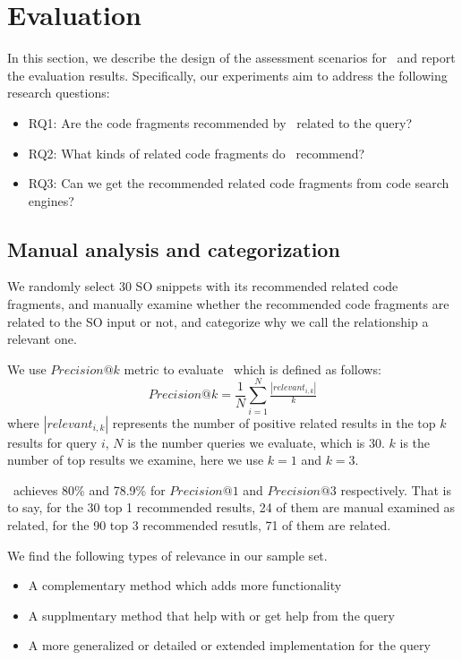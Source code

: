 \section{Evaluation}
\label{sec:Evaluation}
In this section, we describe the design of the assessment scenarios for \tool\ and report the evaluation results. Specifically, our experiments aim to address the following research questions:
\begin{itemize}
	\item RQ1: Are the code fragments recommended by \tool\ related to the query?
	\item RQ2: What kinds of related code fragments do \tool\ recommend?
	\item RQ3: Can we get the recommended related code fragments from code search engines?
\end{itemize}

\subsection{Manual analysis and categorization}
We randomly select 30 SO snippets with its recommended related code fragments, and manually examine whether the recommended code fragments are related to the SO input or not, and categorize why we call the relationship a relevant one.

We use $Precision@k$ metric to evaluate \tool\  which is defined as follows:
\begin{equation}
Precision@k = \frac{1}{N}\sum_{i=1}^{N}\tfrac{\left | relevant_{i,k} \right |}{k}
\end{equation}
where $\left | relevant_{i,k} \right |$ represents the number of positive related results in the top $k$ results for query $i$, $N$ is the number queries we evaluate, which is $30$. $k$ is the number of top results we examine, here we use $k=1$ and $k=3$.

\tool\ achieves 80\% and 78.9\% for $Precision@1$ and $Precision@3$ respectively. That is to say, for the 30 top 1 recommended results, 24 of them are manual examined as related, for the 90 top 3 recommended resutls, 71 of them are related.

We find the following types of relevance in our sample set.
\begin{itemize}
	\item A complementary method which adds more functionality
	\item A supplmentary method that help with or get help from the query 
	\item A more generalized or detailed or extended implementation for the query	
\end{itemize}

